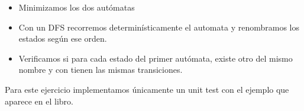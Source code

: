 \documentclass{article}
\begin{document}
\begin{itemize}
\item Minimizamos los dos autómatas
\item Con un DFS recorremos determinísticamente el automata y renombramos los estados según ese orden.
\item Verificamos si para cada estado del primer autómata, existe otro del mismo nombre y con tienen las mismas transiciones.
\end{itemize}

Para este ejercicio implementamos únicamente un unit test con el ejemplo que aparece en el libro.




\end{document}
